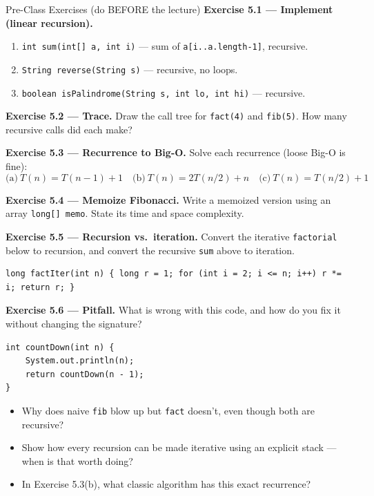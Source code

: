 \documentclass[11pt]{article}
\begin{document}
\begin{exbox}{Pre-Class Exercises (do BEFORE the lecture)}
\textbf{Exercise 5.1 --- Implement (linear recursion).}
\begin{enumerate}[label=(\alph*)]
  \item \verb|int sum(int[] a, int i)| --- sum of \verb|a[i..a.length-1]|, recursive.
  \item \verb|String reverse(String s)| --- recursive, no loops.
  \item \verb|boolean isPalindrome(String s, int lo, int hi)| --- recursive.
\end{enumerate}

\textbf{Exercise 5.2 --- Trace.} Draw the call tree for \texttt{fact(4)} and \texttt{fib(5)}. How many recursive calls did each make?

\textbf{Exercise 5.3 --- Recurrence to Big-O.} Solve each recurrence (loose Big-O is fine):
\[
\text{(a)}\ T(n)=T(n-1)+1\quad\text{(b)}\ T(n)=2T(n/2)+n\quad\text{(c)}\ T(n)=T(n/2)+1
\]

\textbf{Exercise 5.4 --- Memoize Fibonacci.} Write a memoized version using an array \verb|long[] memo|. State its time and space complexity.

\textbf{Exercise 5.5 --- Recursion vs.\ iteration.} Convert the iterative \texttt{factorial} below to recursion, and convert the recursive \texttt{sum} above to iteration.
\begin{lstlisting}
long factIter(int n) { long r = 1; for (int i = 2; i <= n; i++) r *= i; return r; }
\end{lstlisting}

\textbf{Exercise 5.6 --- Pitfall.} What is wrong with this code, and how do you fix it without changing the signature?
\begin{lstlisting}
int countDown(int n) {
    System.out.println(n);
    return countDown(n - 1);
}
\end{lstlisting}
\end{exbox}

\begin{disbox}
\begin{itemize}[leftmargin=*]
  \item Why does naive \texttt{fib} blow up but \texttt{fact} doesn't, even though both are recursive?
  \item Show how every recursion can be made iterative using an explicit stack --- when is that worth doing?
  \item In Exercise 5.3(b), what classic algorithm has this exact recurrence?
\end{itemize}
\end{disbox}
\end{document}
